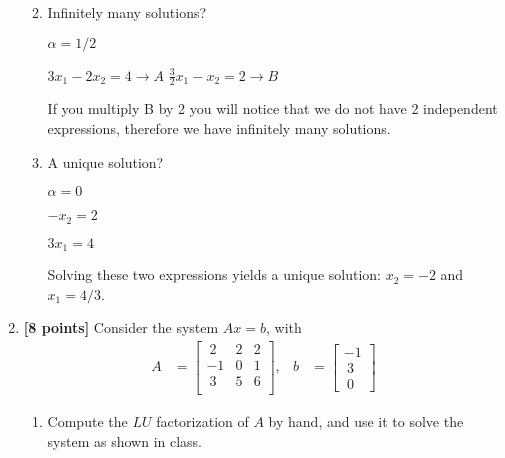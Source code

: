 \documentclass{article}
\begin{document}
\begin{enumerate}
\begin{enumerate}
\begin{mdframed}[style=MyFrame]
\end{mdframed}

\item Infinitely many solutions? \newline

\begin{mdframed}[style=MyFrame]

$\alpha = 1/2$ 

$3x_1 - 2x_2 = 4 \rightarrow A$ \newline
$\frac{3}{2} x_1 - x_2 = 2 \rightarrow B$

If you multiply B by 2 you will notice that we do not have 2 independent expressions, therefore we have infinitely many solutions.

\end{mdframed}

\item A unique solution? \newline

\begin{mdframed}[style=MyFrame]

$\alpha = 0$ 

$-x_2 = 2$

$3x_1 = 4$

Solving these two expressions yields a unique solution: $x_2 = -2$ and $x_1 = 4/3$. 

\end{mdframed}

\end{enumerate}

\item {\bf[8 points]} Consider the system $Ax = b$, with 
\begin{align*}
A &= \begin{bmatrix}
 ~2     &2     &2 \\
    -1     &0     &1 \\
     ~3     &5     &6 \\
\end{bmatrix},
&b &= \begin{bmatrix}-1 \\~3\\~0 \end{bmatrix}
\end{align*}
\begin{enumerate}
\item Compute the $LU$ factorization of $A$ by hand, and use it to solve the system as shown in class. \newline


\end{enumerate}
\end{enumerate}
\end{document}
